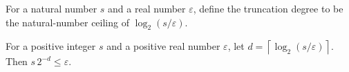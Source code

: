 \begin{definition}
\leanok
For a natural number $s$ and a real number $\varepsilon$, define the truncation degree
to be the natural-number ceiling of $\log_2(s/\varepsilon)$.
\end{definition}

\begin{theorem}
\leanok
{}
For a positive integer $s$ and a positive real number $\varepsilon$, let
$d=\left\lceil\log_2(s/\varepsilon)\right\rceil$. Then $s\,2^{-d}\leq\varepsilon$.
\end{theorem}

